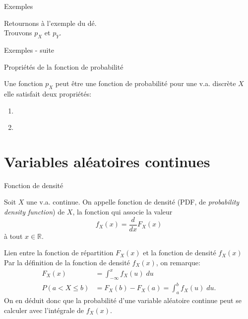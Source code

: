 \documentclass{BeamerTemplate}
\begin{document}
\begin{frame}{Exemples}

\vspace{-1.5 in}
Retournons à l'exemple du dé.\\
Trouvons $p_X$ et $p_Y$.


\end{frame}


\begin{frame}{Exemples - suite}




\end{frame}



\begin{frame}[t]{Propri\'et\'es de la fonction de probabilit\'e}

Une fonction $p_X$ peut être une fonction de probabilité pour une v.a. discrète $X$  elle satisfait deux propriétés:

\vspace{0.2 in}

\begin{enumerate} 
 \item $ $
 \vspace{0.3 in}
 \item $ $
\end{enumerate}

\end{frame}

\section{Variables aléatoires continues}

\begin{frame}[t]{Fonction de densité}

\begin{defn}
Soit $X$ une v.a. continue. On appelle fonction de densité (PDF, de \textit{probability density function}) de $X$, la fonction qui associe la valeur 
$$f_X(x)=\frac{d}{dx}F_X(x)$$
à tout $x\in \mathbb{R}$.
\end{defn}
\end{frame}
\begin{frame}

\begin{Boite}{Lien entre la fonction de répartition $F_X(x)$ et la fonction de densité $f_X(x)$}
Par la définition de la fonction de densité $f_X(x)$, on remarque:
\begin{align*}
 F_X(x)&=\int_{-\infty}^x f_X(u)\;du \\
 P(a<X\le b)&=F_X(b)-F_X(a)=\int_a^bf_X(u)\;du.
\end{align*}
On en déduit donc que la probabilité d'une variable aléatoire continue peut se calculer avec l'intégrale de $f_X(x)$.
\end{Boite}

\end{frame}
\end{document}
